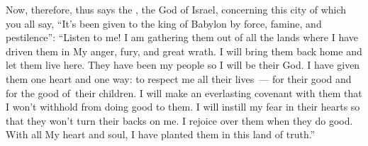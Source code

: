 
\begin{inparaenum}



   Now, therefore, thus says the \lord, the God of Israel, concerning this city of which you all say, ``It's been given to the king of Babylon by force, famine, and pestilence'':%
   ``Listen to me! I am gathering them out of all the lands where I have driven them in My anger, fury, and great wrath. I will bring them back home and let them live here.%
   They have been my people so I will be their God.%
   I have given them one heart and one way: to respect me all their lives~--- for their good and for the good of\understood{}\ their children.%
   I will make an everlasting covenant with them that I won't withhold from doing good to them. I will instill my fear in their hearts so that they won't turn their backs on me.%
   I rejoice over them when they do good. With all My heart and soul, I have planted them in this land of truth.''%

\end{inparaenum}
